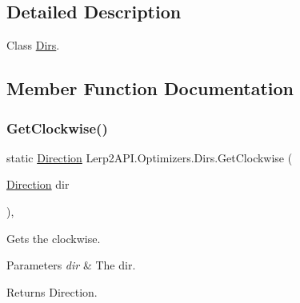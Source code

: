 \subsection{Detailed Description}
Class \hyperlink{class_lerp2_a_p_i_1_1_optimizers_1_1_dirs}{Dirs}. 



\subsection{Member Function Documentation}
\mbox{\label{class_lerp2_a_p_i_1_1_optimizers_1_1_dirs_a9737770f69132bccb97e85e7424cb783}} 
\subsubsection{\texorpdfstring{Get\+Clockwise()}{GetClockwise()}}
{\footnotesize\ttfamily static \hyperlink{namespace_lerp2_a_p_i_1_1_optimizers_a159a6f85bec1076b8b34d5da86c7cafe}{Direction} Lerp2\+A\+P\+I.\+Optimizers.\+Dirs.\+Get\+Clockwise (\begin{DoxyParamCaption}\item[{\hyperlink{namespace_lerp2_a_p_i_1_1_optimizers_a159a6f85bec1076b8b34d5da86c7cafe}{Direction}}]{dir }\end{DoxyParamCaption})\hspace{0.3cm}{\ttfamily [inline]}, {\ttfamily [static]}}



Gets the clockwise. 


\begin{DoxyParams}{Parameters}
{\em dir} & The dir.\\
\hline
\end{DoxyParams}
\begin{DoxyReturn}{Returns}
Direction.
\end{DoxyReturn}
\mbox{\label{class_lerp2_a_p_i_1_1_optimizers_1_1_dirs_a159b07530e6726e2375b4850448ffd90}} 
